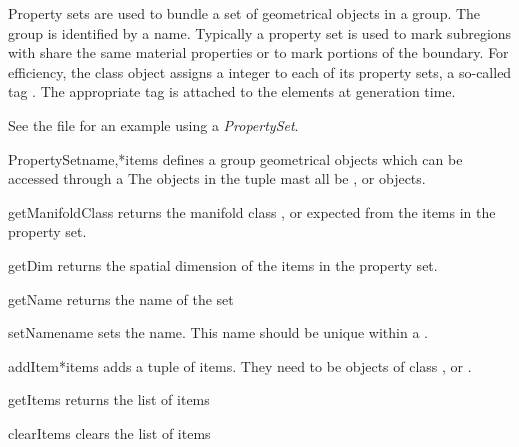 Property sets are used to bundle a set of geometrical objects in a
group.  The group is identified by a name.  Typically a property set
is used to mark subregions with share the same material properties or
to mark portions of the boundary.  For efficiency, the \Design class
object assigns a integer to each of its property sets, a so-called tag
.  The appropriate tag is attached to the elements at
generation time.

See the file  for an example using a {\it PropertySet}.


\begin{classdesc}{PropertySet}{name,*items}
defines a group geometrical objects which can be accessed through a 
The objects in the tuple  mast all be \ManifoldOneD, \ManifoldTwoD or \ManifoldThreeD objects.
\end{classdesc}


\begin{methoddesc}[PropertySet]{getManifoldClass}{}
returns the manifold class \ManifoldOneD, \ManifoldTwoD or \ManifoldThreeD expected from the items
in the property set.
\end{methoddesc}

\begin{methoddesc}[PropertySet]{getDim}{}
returns the spatial dimension of the items
in the property set. 
\end{methoddesc}

\begin{methoddesc}[PropertySet]{getName}{}
returns the name of the set
\end{methoddesc}

\begin{methoddesc}[PropertySet]{setName}{name}
sets the name. This name should be unique within a \Design.
\end{methoddesc}

\begin{methoddesc}[PropertySet]{addItem}{*items}
adds a tuple of items. They need to be objects of class \ManifoldOneD, \ManifoldTwoD or \ManifoldThreeD. 
\end{methoddesc}

\begin{methoddesc}[PropertySet]{getItems}{}
returns the list of items
\end{methoddesc}

\begin{methoddesc}[PropertySet]{clearItems}{}
clears the list of items 
\end{methoddesc}

